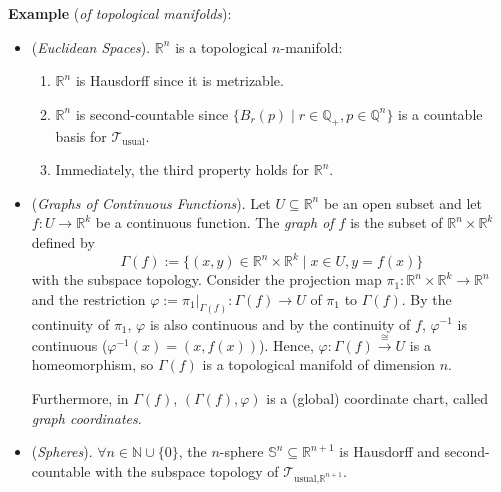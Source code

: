 \noindent\textbf{Example} (\textit{of topological manifolds}): \begin{itemize}
    \item (\textit{Euclidean Spaces}). $\mathbb{R}^n$ is a topological $n$-manifold:
    \begin{enumerate}
        \item $\mathbb{R}^n$ is Hausdorff since it is metrizable.
        \item $\mathbb{R}^n$ is second-countable since $\{ B_r(p) \mid r\in \mathbb{Q}_+, p\in \mathbb{Q}^n\}$ is a countable basis for $\mathcal{T}_{\text{usual}}$.

        \item Immediately, the third property holds for $\mathbb{R}^n$.
    \end{enumerate}

    \item (\textit{Graphs of Continuous Functions}). Let $U\subseteq \mathbb{R}^n$ be an open subset and let $f:U\to \mathbb{R}^k$ be a continuous function. The \textit{graph of $f$} is the subset of $\mathbb{R}^n \times \mathbb{R}^k$ defined by
    \[
    \Gamma(f) := \{ (x,y) \in \mathbb{R}^n \times \mathbb{R}^k \mid x\in U, y=f(x) \}
    \]
    with the subspace topology. Consider the projection map $\pi_1: \mathbb{R}^n\times \mathbb{
    R
    }^k \to \mathbb{R}^n$ and the restriction $\varphi:= \pi_1|_{\Gamma(f)} :\Gamma(f) \to U$ of $\pi_1$ to $\Gamma(f)$. By the continuity of $\pi_1$, $\varphi$ is also continuous and by the continuity of $f$, $\varphi^{-1}$ is continuous ($\varphi^{-1}(x)= (x,f(x))$). Hence, $\varphi: \Gamma(f) \xrightarrow{\cong} U$ is a homeomorphism, so $\Gamma(f)$ is a topological manifold of dimension $n$.

    Furthermore, in $\Gamma(f)$, $(\Gamma (f),\varphi)$ is a (global) coordinate chart, called \textit{graph coordinates}.

    \item (\textit{Spheres}). $\forall n\in \mathbb{N} \cup \{0\}$, the $n$-sphere $\mathbb{S}^n \subseteq \mathbb{R}^{n+1}$ is Hausdorff and second-countable with the subspace topology of $\mathcal{T}_{\text{usual,} \mathbb{R}^{n+1}}$.


\end{itemize}

